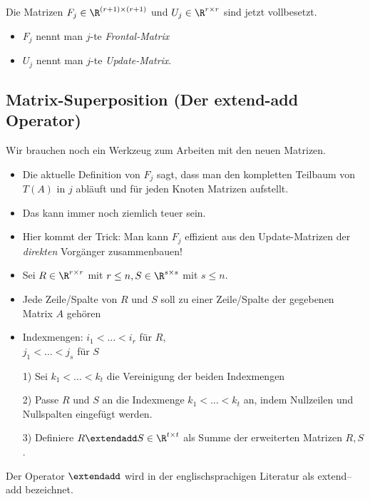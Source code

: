 Die Matrizen $F_j \in \R^{(r+1) \times (r+1)}$ und $U_j \in \R^{r \times r}$ sind
jetzt vollbesetzt.
\begin{itemize}
 \item $F_j$ nennt man $j$-te \emph{Frontal-Matrix}
 \item $U_j$ nennt man $j$-te \emph{Update-Matrix}.
\end{itemize}


\subsection{Matrix-Superposition (Der extend-add Operator)}
Wir brauchen noch ein Werkzeug zum Arbeiten mit den neuen Matrizen.

\begin{itemize}
 \item Die aktuelle Definition von $F_j$ sagt, dass man den kompletten Teilbaum von $T(A)$ in $j$ abläuft und für jeden Knoten Matrizen aufstellt.
 \item Das kann immer noch ziemlich teuer sein.
 \item Hier kommt der Trick: Man kann $F_j$ effizient aus den Update-Matrizen der \emph{direkten} Vorgänger
   zusammenbauen!
\end{itemize}

\begin{itemize}
 \item Sei $R \in \R^{r \times r}$ mit $r \leq n,S \in \R^{s \times s}$ mit $s \leq n$.
 \item Jede Zeile/Spalte von $R$ und $S$ soll zu einer Zeile/Spalte der gegebenen Matrix $A$ gehören
 \item Indexmengen: $i_1<\ldots<i_r$ für $R$, \\ $j_1<\ldots<j_s$ für $S$
 \item[1)] Sei $k_1<\ldots < k_t$ die Vereinigung der beiden Indexmengen
 \item[2)] Passe $R$ und $S$ an die Indexmenge $k_1<\ldots<k_t$ an, indem Nullzeilen und Nullspalten eingefügt werden.
 \item[3)] Definiere $R \extendadd S \in \R^{t \times t}$ als Summe der erweiterten Matrizen $R,S$.
\end{itemize}

Der Operator $\extendadd$ wird in der englischsprachigen Literatur als \glqq extend--add\grqq{}
bezeichnet.

